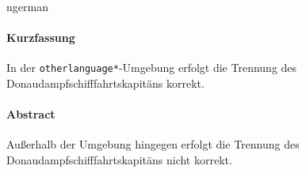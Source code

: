 \cleardoublepage

\begin{otherlanguage*}{ngerman}
\begin{center}
\paragraph{Kurzfassung}
\hrulefill
\end{center}
In der \texttt{otherlanguage*}-Umgebung erfolgt die Trennung des Donaudampfschifffahrtskapitäns korrekt.
\end{otherlanguage*}

\vspace {2cm}
\begin{center}
\paragraph{Abstract}
\hrulefill
\end{center}
Außerhalb der Umgebung hingegen erfolgt die Trennung des Donaudampfschifffahrtskapitäns nicht korrekt.
